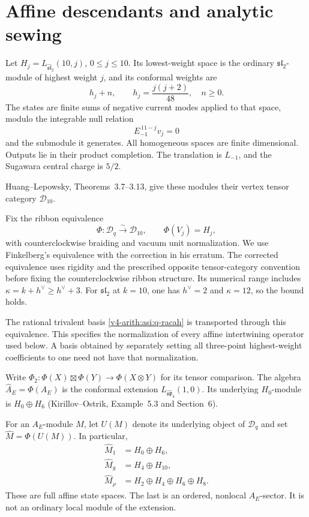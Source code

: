 \section{Affine descendants and analytic sewing}
\label{v4-arith:asi:sec:affine-sewing}

Let $H_j=L_{\widehat{\mathfrak{sl}}_2}(10,j)$, $0\leq j\leq10$.
Its lowest-weight space is the ordinary $\mathfrak{sl}_2$-module of
highest weight $j$, and its conformal weights are
\[
 h_j+n,\qquad h_j=\frac{j(j+2)}{48},\quad n\geq0.
\]
The states are finite sums of negative current modes applied to that
space, modulo the integrable null relation
\begin{equation}\label{v4-arith:asi:affine-null}
 E_{-1}^{\,11-j}v_j=0
\end{equation}
and the submodule it generates. All homogeneous spaces are finite
dimensional. Outputs lie in their product completion. The translation
is $L_{-1}$, and the Sugawara central charge is $5/2$.

Huang--Lepowsky, Theorems~3.7--3.13, give these modules their
vertex tensor category \(\mathcal D_{10}\).

Fix the ribbon equivalence
\[
 \Phi:\mathcal D_q\xrightarrow{\ \sim\ }\mathcal D_{10},
 \qquad \Phi(V_j)=H_j,
\]
with counterclockwise braiding and vacuum unit normalization.
We use Finkelberg's equivalence with the correction in his erratum.
The corrected equivalence uses rigidity and the prescribed opposite
tensor-category convention before fixing the counterclockwise
ribbon structure. Its numerical range includes
\(\kappa=k+h^\vee\ge h^\vee+3\).
For \(\mathfrak{sl}_2\) at \(k=10\), one has
\(h^\vee=2\) and \(\kappa=12\), so the bound holds.

The rational trivalent basis \eqref{v4-arith:asi:q-racah} is transported
through this equivalence. This specifies the normalization of every
affine intertwining operator used below. A basis obtained by separately
setting all three-point highest-weight coefficients to one need not
have that normalization.

Write $\Phi_2:\Phi(X)\boxtimes\Phi(Y)\to\Phi(X\otimes Y)$ for its
tensor comparison. The algebra $\widehat A_E=\Phi(A_E)$ is the conformal
extension $L_{\widehat{\mathfrak{sp}}_4}(1,0)$. Its underlying
$H_0$-module is $H_0\oplus H_6$ (Kirillov--Ostrik, Example~5.3 and Section~6).


For an $A_E$-module $M$, let $U(M)$ denote its underlying object of
$\mathcal D_q$ and set $\widehat M=\Phi(U(M))$. In particular,
\begin{equation}\label{v4-arith:asi:e6-full-states}
 \begin{split}
 \widehat M_1&=H_0\oplus H_6,\\
 \widehat M_g&=H_4\oplus H_{10},\\
 \widehat M_\rho&=H_2\oplus H_4\oplus H_6\oplus H_8.
 \end{split}
\end{equation}
These are full affine state spaces. The last is an ordered, nonlocal
$\widehat A_E$-sector. It is not an ordinary local module of the
extension.

